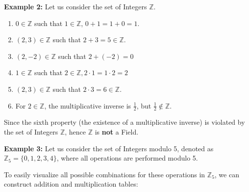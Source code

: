 \documentclass[11pt, a4paper]{article}
\begin{document}
	\newpage
	\noindent \textbf{Example 2:} Let us consider the set of Integers $\mathbb{Z}$.
	
	\begin{enumerate}
		\item $0 \in \mathbb{Z}$ such that $1 \in \mathbb{Z}$, $0 + 1 = 1 + 0 = 1$. 
		\item $(2,3) \in \mathbb{Z}$ such that $2 + 3 = 5 \in \mathbb{Z}$.
		\item $(2, -2) \in \mathbb{Z}$ such that $ 2 + (-2) = 0$
		\item $1 \in \mathbb{Z}$ such that $2 \in \mathbb{Z}, 2 \cdot 1 = 1 \cdot 2 = 2$
		\item $(2,3) \in \mathbb{Z}$ such that $2 \cdot 3 = 6 \in \mathbb{Z}$.
		\item For $2 \in \mathbb{Z}$, the multiplicative inverse is $\frac{1}{2}$, but $\frac{1}{2} \notin \mathbb{Z}$.
	\end{enumerate}
	Since the sixth property (the existence of a multiplicative inverse) is violated by the set of Integers $\mathbb{Z}$, hence $\mathbb{Z}$ is \textbf{not} a Field.
	
	\vspace{0.5em}
	
	\noindent \textbf{Example 3:} Let us consider the set of Integers modulo 5, denoted as $\mathbb{Z}_5 = \{0, 1, 2, 3, 4\}$, where all operations are performed modulo 5.
	
	\vspace{1em}
	\noindent To easily visualize all possible combinations for these operations in $\mathbb{Z}_5$, we can construct addition and multiplication tables:
	
\end{document}
